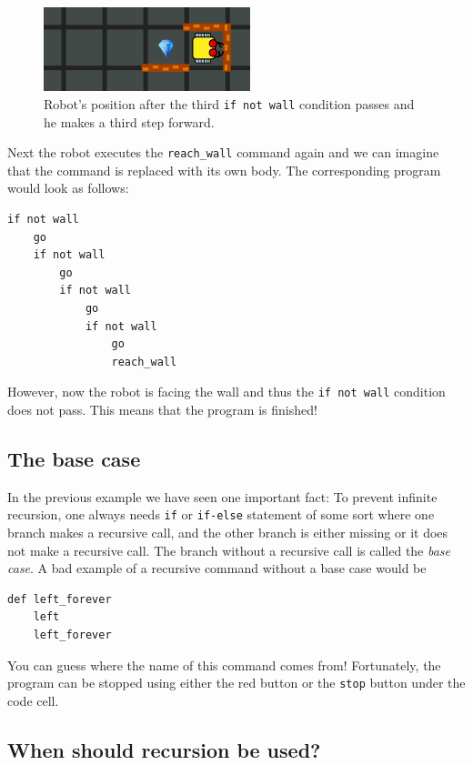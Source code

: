 \begin{figure}[!ht]
\begin{center}
\includegraphics[width=6cm]{imgk/rec-4.png}
\end{center}
\vspace{-4mm}
\caption{Robot's position after the third {\tt if not wall} condition passes and he makes a third step forward.}
\label{fig:rec4}
\end{figure}
\noindent
Next the robot executes the {\tt reach\_wall} command again and we can imagine that the command 
is replaced with its own body. The corresponding program would look as follows:

\begin{verbatim}
if not wall
    go
    if not wall
        go
        if not wall
            go
            if not wall
                go
                reach_wall
\end{verbatim}
\noindent
However, now the robot is facing the wall and thus the {\tt if not wall} condition does not pass.  
This means that the program is finished!

\subsection{The base case}

In the previous example we have seen one important fact: To prevent infinite recursion, one always needs {\tt if} or {\tt if-else} 
statement of some sort where one branch makes a recursive call, and the other branch is either 
missing or it does not make a recursive call. The branch without a recursive 
call is called the {\em base case}. A bad example of a recursive command without a base case would be 

\begin{verbatim}
def left_forever
    left
    left_forever
\end{verbatim}
\noindent
You can guess where the name of this command comes from! Fortunately, the program can be stopped using 
either the red button or the {\tt stop} button under the code cell.

\subsection{When should recursion be used?}

